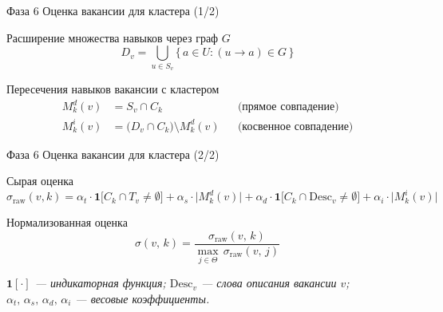 \documentclass[12pt]{beamer}
\begin{document}
\begin{frame}{Фаза 6 \textendash{} Оценка вакансии для кластера (1/2)}

  \begin{block}{Расширение множества навыков через граф $G$}
    \[
      D_v = \bigcup_{u \in S_v} \bigl\{\,a \in U : (u \to a) \in G\,\bigr\}
    \]
  \end{block}

  \begin{block}{Пересечения навыков вакансии с кластером}
    \begin{align*}
      M^d_k(v) &= S_v \cap C_k
        && \text{(прямое совпадение)} \\[6pt]
      M^i_k(v) &= \bigl(D_v \cap C_k\bigr) \setminus M^d_k(v)
        && \text{(косвенное совпадение)}
    \end{align*}
  \end{block}

\end{frame}

\begin{frame}{Фаза 6 \textendash{} Оценка вакансии для кластера (2/2)}

  \begin{block}{Сырая оценка}
    \[
      \sigma_{\mathrm{raw}}(v,k) =
        \alpha_t \cdot \mathbf{1}\bigl[C_k \cap T_v \neq \emptyset\bigr]
        + \alpha_s \cdot \bigl|M^d_k(v)\bigr|
        + \alpha_d \cdot \mathbf{1}\bigl[C_k \cap \mathrm{Desc}_v \neq \emptyset\bigr]
        + \alpha_i \cdot \bigl|M^i_k(v)\bigr|
    \]
  \end{block}

  \begin{block}{Нормализованная оценка}
    \[
      \sigma(v,\,k) = \frac{\sigma_{\mathrm{raw}}(v,\,k)}
                           {\max_{j \in \Theta}\,\sigma_{\mathrm{raw}}(v,\,j)}
    \]
  \end{block}

  \smallskip
  \textit{$\mathbf{1}[\cdot]$ --- индикаторная функция;\quad
          $\mathrm{Desc}_v$ --- слова описания вакансии $v$;\quad
          $\alpha_t,\,\alpha_s,\,\alpha_d,\,\alpha_i$ --- весовые коэффициенты.}
\end{frame}
\end{document}
